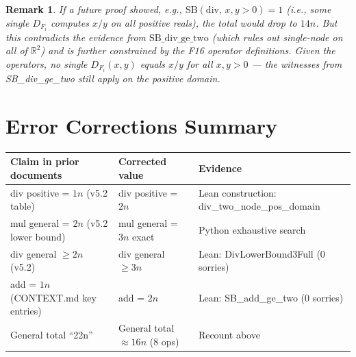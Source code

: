 \documentclass[11pt]{article}
\newtheorem{remark}[theorem]{Remark}
\begin{document}
\begin{remark}
If a future proof showed, e.g., $\mathrm{SB}(\mathrm{div},\, x,y>0) = 1$
(i.e., some single $D_{F_i}$ computes $x/y$ on all positive reals), the total would drop to $14n$.
But this contradicts the evidence from $\mathrm{SB\_div\_ge\_two}$ (which rules out single-node
on all of $\mathbb{R}^2$) and is further constrained by the F16 operator definitions.
Given the operators, no single $D_{F_i}(x,y)$ equals $x/y$ for all $x,y > 0$ ---
the witnesses from SB\_div\_ge\_two still apply on the positive domain.
\end{remark}

\section{Error Corrections Summary}

\begin{center}
\begin{tabular}{p{4cm}p{4cm}p{4cm}}
\toprule
Claim in prior documents & Corrected value & Evidence \\
\midrule
div positive = $1n$ (v5.2 table) & div positive = $2n$ & Lean construction: div\_two\_node\_pos\_domain \\
mul general = $2n$ (v5.2 lower bound) & mul general = $3n$ exact & Python exhaustive search \\
div general $\geq 2n$ (v5.2) & div general $\geq 3n$ & Lean: DivLowerBound3Full (0 sorries) \\
add = $1n$ (CONTEXT.md key entries) & add = $2n$ & Lean: SB\_add\_ge\_two (0 sorries) \\
General total ``22n'' & General total $\approx 16n$ (8 ops) & Recount above \\
\bottomrule
\end{tabular}
\end{center}
\end{document}
